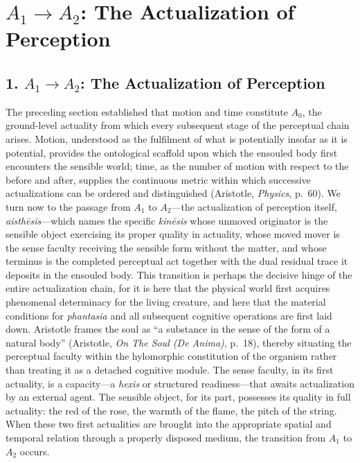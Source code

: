 \documentclass[12pt]{article}
\begin{document}
\section*{$A_1 \to A_2$: The Actualization of Perception}

\subsection*{1. $A_1 \to A_2$: The Actualization of Perception}

The preceding section established that motion and time constitute $A_0$, the ground-level actuality from which every subsequent stage of the perceptual chain arises. Motion, understood as the fulfilment of what is potentially insofar as it is potential, provides the ontological scaffold upon which the ensouled body first encounters the sensible world; time, as the number of motion with respect to the before and after, supplies the continuous metric within which successive actualizations can be ordered and distinguished (Aristotle, \textit{Physics}, p.~60). We turn now to the passage from $A_1$ to $A_2$---the actualization of perception itself, \textit{aisthēsis}---which names the specific \textit{kinēsis} whose unmoved originator is the sensible object exercising its proper quality in actuality, whose moved mover is the sense faculty receiving the sensible form without the matter, and whose terminus is the completed perceptual act together with the dual residual trace it deposits in the ensouled body. This transition is perhaps the decisive hinge of the entire actualization chain, for it is here that the physical world first acquires phenomenal determinacy for the living creature, and here that the material conditions for \textit{phantasia} and all subsequent cognitive operations are first laid down. Aristotle frames the soul as ``a substance in the sense of the form of a natural body'' (Aristotle, \textit{On The Soul (De Anima)}, p.~18), thereby situating the perceptual faculty within the hylomorphic constitution of the organism rather than treating it as a detached cognitive module. The sense faculty, in its first actuality, is a capacity---a \textit{hexis} or structured readiness---that awaits actualization by an external agent. The sensible object, for its part, possesses its quality in full actuality: the red of the rose, the warmth of the flame, the pitch of the string. When these two first actualities are brought into the appropriate spatial and temporal relation through a properly disposed medium, the transition from $A_1$ to $A_2$ occurs.
\end{document}
